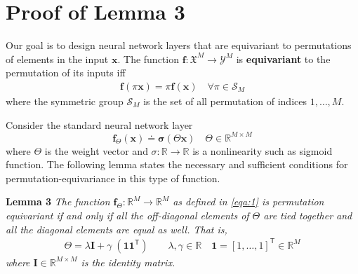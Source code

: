\documentclass{article}
\newcommand{\xx}[0]{\ensuremath{\mathbf{x}}}
\newcommand{\ff}[0]{\ensuremath{\mathbf{f}}}
\begin{document}
\newpage
\section{Proof of Lemma 3}

Our goal is to design neural network layers that are equivariant to permutations of elements in the input $\xx$. The function $\ff: \mathfrak{X}^{M} \to \mathcal{Y}^{M}$ is \textbf{equivariant} to the permutation of its inputs iff 
\begin{align*}
  \ff(\pi \xx) = \pi \ff(\xx) \quad \forall \pi \in \mathcal{S}_M
\end{align*}
where the symmetric group $\mathcal{S}_M$ is the set of all permutation of indices $1,\ldots,M$.


Consider the standard neural network layer
\begin{equation}\label{eqa:1}
  \ff_{\Theta}(\xx) \doteq \boldsymbol{\sigma}( \Theta \xx) \quad \Theta \in \mathbb{R}^{M \times M}
\end{equation}
where $\Theta$ is the weight vector and $\sigma: \mathbb{R} \to \mathbb{R}$ is a nonlinearity such as sigmoid function. The following lemma states the necessary and sufficient conditions for permutation-equivariance in this type of function. 

\textbf{Lemma 3} {\em 
\; The function $\ff_{\Theta}: \mathbb{R}^{M} \to \mathbb{R}^{M}$ as defined in \eqref{eqa:1} is permutation equivariant if and only if all the off-diagonal elements of $\Theta$ are tied together and all the diagonal elements are equal as well. That is,
\begin{align}
 \Theta = {\lambda} \mathbf{I} + {\gamma} \; (\mathbf{1} \mathbf{1}^{\mathsf{T}})\quad\quad {\lambda},{\gamma} \in \mathbb{R} \quad \mathbf{1} = [1,\ldots,1]^{\mathsf{T}} \in \mathbb{R}^M
 \nonumber
\end{align}
where $\mathbf{I}\in\mathbb{R}^{M\times M}$ is the identity matrix.
}
\end{document}
